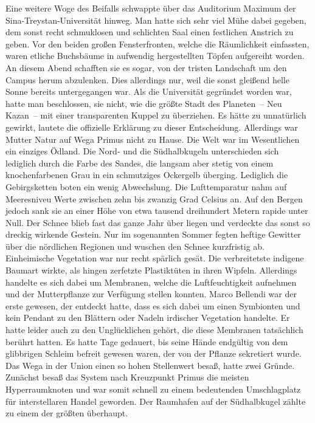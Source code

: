 Eine weitere Woge des Beifalls schwappte über das Auditorium Maximum der Sina-Treystan-Universität hinweg. Man hatte sich sehr viel Mühe dabei gegeben, dem sonst recht schmuklosen und schlichten Saal einen festlichen Anstrich zu geben. Vor den beiden großen Fensterfronten, welche die Räumlichkeit einfassten, waren etliche Buchsbäume in aufwendig hergestellten Töpfen aufgereiht worden. An diesem Abend schafften sie es sogar, von der tristen Landschaft um den Campus herum abzulenken. Dies allerdings nur, weil die sonst gleißend helle Sonne bereits untergegangen war.
Als die Universität gegründet worden war, hatte man beschlossen, sie nicht, wie die größte Stadt des Planeten – Neu Kazan – mit einer transparenten Kuppel zu überziehen. Es hätte zu unnatürlich gewirkt, lautete die offizielle Erklärung zu dieser Entscheidung. Allerdings war Mutter Natur auf Wega Primus nicht zu Hause. Die Welt war im Wesentlichen ein einziges Ödland. Die Nord- und die Südhalbkugeln unterschieden sich lediglich durch die Farbe des Sandes, die langsam aber stetig von einem knochenfarbenen Grau in ein schmutziges Ockergelb überging.
Lediglich die Gebirgsketten boten ein wenig Abwechslung. Die Lufttemparatur nahm auf Meeresniveu Werte zwischen zehn bis zwanzig Grad Celsius an. Auf den Bergen jedoch sank sie an einer Höhe von etwa tausend dreihundert Metern rapide unter Null. Der Schnee blieb fast das ganze Jahr über liegen und verdeckte das sonst so dreckig wirkende Gestein. Nur im sogenannten Sommer fegten heftige Gewitter über die nördlichen Regionen und wuschen den Schnee kurzfristig ab.
Einheimische Vegetation war nur recht spärlich gesät. Die verbreitetste indigene Baumart wirkte, als hingen zerfetzte Plastiktüten in ihren Wipfeln. Allerdings handelte es sich dabei um Membranen, welche die Luftfeuchtigkeit aufnehmen und der Mutterpflanze zur Verfügung stellen konnten.
Marco Bellendi war der erste gewesen, der entdeckt hatte, dass es sich dabei um einen Symbionten und kein Pendant zu den Blättern oder Nadeln irdischer Vegetation handelte. Er hatte leider auch zu den Unglücklichen gehört, die diese Membranen tatsächlich berührt hatten. Es hatte Tage gedauert, bis seine Hände endgültig von dem glibbrigen Schleim befreit gewesen waren, der von der Pflanze sekretiert wurde.
Das Wega in der Union einen so hohen Stellenwert besaß, hatte zwei Gründe. Zunächst besaß das System nach Kreuzpunkt Primus die meisten Hyperraumknoten und war somit schnell zu einem bedeutenden Umschlagplatz für interstellaren Handel geworden. Der Raumhafen auf der Südhalbkugel zählte zu einem der größten überhaupt.
